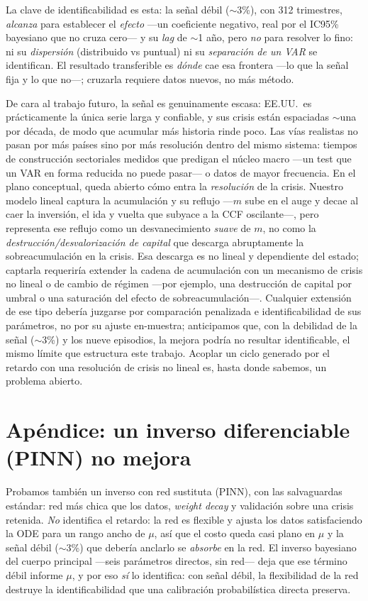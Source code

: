 \documentclass[11pt]{article}
\begin{document}
La clave de identificabilidad es esta: la señal débil ($\sim$3\%), con 312 trimestres, \emph{alcanza}
para establecer el \emph{efecto} ---un coeficiente negativo, real por el IC95\% bayesiano que no cruza
cero--- y su \emph{lag} de $\sim$1 año, pero \emph{no} para resolver lo fino: ni su \emph{dispersión}
(distribuido vs puntual) ni su \emph{separación de un VAR} se identifican. El resultado transferible
es \emph{dónde} cae esa frontera ---lo que la señal fija y lo que no---; cruzarla requiere datos
nuevos, no más método.

De cara al trabajo futuro, la señal es genuinamente escasa: EE.UU.\ es prácticamente la única serie
larga y confiable, y sus crisis están espaciadas $\sim$una por década, de modo que acumular más
historia rinde poco. Las vías realistas no pasan por más países sino por más resolución dentro del
mismo sistema: tiempos de construcción sectoriales medidos que predigan el núcleo macro ---un test
que un VAR en forma reducida no puede pasar--- o datos de mayor frecuencia. En el plano conceptual,
queda abierto cómo entra la \emph{resolución} de la crisis. Nuestro modelo lineal captura la
acumulación y su reflujo ---$m$ sube en el auge y decae al caer la inversión, el ida y vuelta que
subyace a la CCF oscilante---, pero representa ese reflujo como un desvanecimiento \emph{suave} de
$m$, no como la \emph{destrucción/desvalorización de capital} que descarga abruptamente la
sobreacumulación en la crisis. Esa descarga es no lineal y dependiente del estado; captarla
requeriría extender la cadena de acumulación con un mecanismo de crisis no lineal o de cambio de
régimen ---por ejemplo, una destrucción de capital por umbral o una saturación del efecto de
sobreacumulación---. Cualquier extensión de ese tipo debería juzgarse por comparación penalizada e
identificabilidad de sus parámetros, no por su ajuste en-muestra; anticipamos que, con la debilidad
de la señal ($\sim$3\%) y los nueve episodios, la mejora podría no resultar identificable, el mismo
límite que estructura este trabajo. Acoplar un ciclo generado por el retardo con una resolución de
crisis no lineal es, hasta donde sabemos, un problema abierto.

\section*{Apéndice: un inverso diferenciable (PINN) no mejora}
Probamos también un inverso con red sustituta (PINN), con las salvaguardas
estándar: red más chica que los datos, \emph{weight decay} y validación sobre una crisis retenida.
\emph{No} identifica el retardo: la red es flexible y ajusta los datos satisfaciendo la ODE para un
rango ancho de $\mu$, así que el costo queda casi plano en $\mu$ y la señal débil ($\sim$3\%) que
debería anclarlo se \emph{absorbe} en la red. El inverso bayesiano del cuerpo principal ---seis
parámetros directos, sin red--- deja que ese término débil informe $\mu$, y por eso \emph{sí} lo
identifica: con señal débil, la flexibilidad de la red destruye la identificabilidad que una
calibración probabilística directa preserva.
\end{document}

